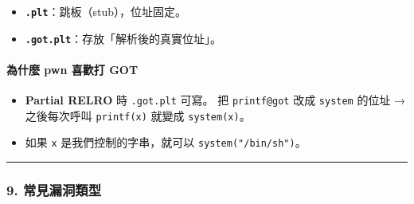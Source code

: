 \documentclass[10pt,a4paper]{article}
\providecommand{\tightlist}{%
  \setlength{\itemsep}{0pt}\setlength{\parskip}{0pt}}
\begin{document}
\begin{itemize}
\tightlist
\item
  \textbf{\texttt{.\allowbreak{}plt}}：跳板（stub），位址固定。
\item
  \textbf{\texttt{.\allowbreak{}got.\allowbreak{}plt}}：存放「解析後的真實位址」。
\end{itemize}

\paragraph{為什麼 pwn 喜歡打
GOT}\label{ux70baux4ec0ux9ebc-pwn-ux559cux6b61ux6253-got}

\begin{itemize}
\tightlist
\item
  \textbf{Partial RELRO} 時 \texttt{.\allowbreak{}got.\allowbreak{}plt} 可寫。 把
  \texttt{printf@got} 改成 \texttt{system} 的位址 → 之後每次呼叫
  \texttt{printf(x)} 就變成 \texttt{system(x)}。
\item
  如果 \texttt{x} 是我們控制的字串，就可以 \texttt{system("/\allowbreak{}bin/\allowbreak{}sh")}。
\end{itemize}

\begin{center}\rule{0.5\linewidth}{0.5pt}\end{center}

\subsubsection{9.
常見漏洞類型}\label{ux5e38ux898bux6f0fux6d1eux985eux578b}
\end{document}
